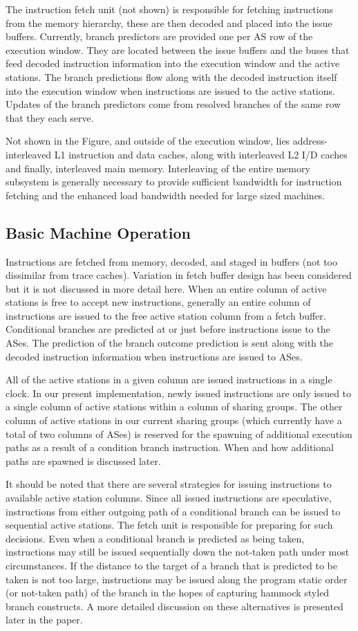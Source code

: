 \documentclass[10pt,dvips]{article}
\begin{document}
The instruction fetch unit (not shown) is responsible for
fetching instructions from the memory hierarchy, these are then decoded
and placed into the issue buffers.   
Currently, branch predictors are provided one per AS row of the execution
window.  
They are located between the issue buffers and the buses that feed
decoded instruction information into the execution window and the
active stations.  
The branch predictions flow along with
the decoded instruction itself into the
execution window when instructions are issued to the active stations.
Updates of the branch predictors come from resolved branches
of the same row that they each serve.

Not shown in the Figure, and outside of the execution window,
lies address-interleaved L1 instruction and data caches, along with
interleaved L2 I/D caches and finally, interleaved main memory.
Interleaving of the entire memory subsystem is generally necessary
to provide sufficient bandwidth for instruction fetching and the
enhanced load bandwidth needed for large sized machines.
%
\subsection{Basic Machine Operation}
%
Instructions are fetched from memory, decoded, and staged in buffers
(not too dissimilar from trace caches).  Variation in fetch buffer
design has been considered but it is not discussed in more detail here.
When an entire column
of active stations is free to accept new instructions, generally
an entire column of instructions are issued to the free active station
column from a fetch buffer.
Conditional branches are
predicted at or just before instructions issue to the ASes.
The prediction of the branch outcome 
prediction is sent along with the
decoded instruction information when instructions are issued to
ASes.

All of the active stations in a given column are issued instructions
in a single clock.  
In our present implementation, newly issued instructions
are only issued to a single column of active stations within
a column of sharing groups.  The other column of active stations
in our current sharing groups (which currently have a total
of two columns of ASes) is reserved for the spawning of additional
execution paths as a result of a condition branch instruction.
When and how additional paths are spawned is discussed later.

It should be noted that there are several strategies for
issuing instructions to available active station columns.
Since all issued instructions are speculative, instructions
from either outgoing path of a conditional branch can be issued
to sequential active stations.
The fetch unit is responsible for preparing for such decisions.
Even when a conditional branch is predicted as being taken,
instructions may still be issued sequentially down the not-taken
path under most circumstances.  If the distance to the target 
of a branch
that is predicted to be taken is not too large,
instructions may be issued along the program static order (or not-taken
path) of the branch in the hopes of capturing hammock styled branch
constructs.  A more detailed discussion on these alternatives is
presented later in the paper.
\end{document}
